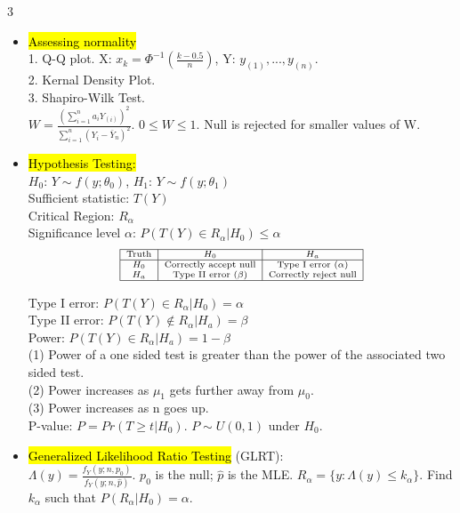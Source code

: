 \documentclass[a4paper,10pt]{article}
\begin{document}
\begin{multicols}{3}
\begin{itemize}
    \item \hl{Assessing normality}\\
    1. Q-Q plot. X: $x_k=\Phi^{-1}(\frac{k-0.5}{n})$, Y: $y_{(1)},...,y_{(n)}$.\\
    2. Kernal Density Plot.\\
    3. Shapiro-Wilk Test.\\ $W=\frac{(\sum_{i=1}^na_iY_{(i)})^2}{\sum_{i=1}^n(Y_i-\bar{Y}_n)^2}$. $0\le W\le 1$. Null is rejected for smaller values of W.
    \item \hl{Hypothesis Testing:}\\
    $H_0$: $Y\sim f(y;\theta_0)$, $H_1$: $Y\sim f(y;\theta_1)$\\ 
    Sufficient statistic: $T(Y)$\\
    Critical Region: $R_\alpha$\\
    Significance level $\alpha$: $P(T(Y)\in R_\alpha|H_0)\le \alpha$\\
    \[
    \scriptsize
    \begin{array}{|c|c|c|}
    \hline
    \text{Truth} & H_0 & H_a \\
    \hline
    H_0 & \text{Correctly accept null} & \text{Type I error } (\alpha) \\
    H_a & \text{Type II error } (\beta) & \text{Correctly reject null} \\
    \hline
    \end{array}
    \]

    Type I error: $P(T(Y)\in R_\alpha|H_0)= \alpha$\\
    Type II error: $P(T(Y)\notin R_\alpha|H_a)= \beta$\\
    Power: $P(T(Y)\in R_\alpha|H_a)= 1-\beta$\\
    (1) Power of a one sided test is greater than the power of the associated two sided test.\\ (2) Power increases as $\mu_1$ gets further away from $\mu_0$.\\(3) Power increases as n goes up.\\
    P-value: $P=Pr(T\ge t|H_0)$. $P\sim U(0,1)$ under $H_0$.
    
    \item \hl{Generalized Likelihood Ratio Testing} (GLRT):\\
    $\Lambda(y)=\frac{f_Y(y;n,p_0)}{f_Y(y;n,\hat{p})}$. $p_0$ is the null; $\hat{p}$ is the MLE. $R_\alpha=\{y:\Lambda(y)\le k_\alpha\}$. Find $k_\alpha$ such that $P(R_\alpha|H_0)=\alpha$.


\end{itemize}
\end{multicols}
\end{document}
